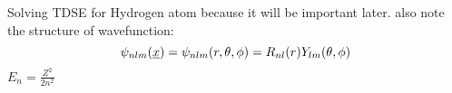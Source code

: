 Solving TDSE for Hydrogen atom because it will be important later. also note the structure of wavefunction:
\begin{equation*}
    \psi_{nlm}(\underline{x}) = \psi_{nlm}(r,\theta,\phi) = R_{nl}(r)Y_{lm}(\theta, \phi)
\end{equation*}
$E_n=\frac{Z^2}{2n^2}$